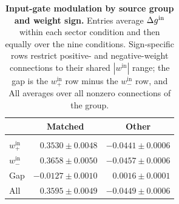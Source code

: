 \begin{table}[t]
\caption{\textbf{Input-gate modulation by source group and weight sign.} Entries average \(\Delta g^{\mathrm{in}}\) within each sector condition and then equally over the nine conditions. Sign-specific rows restrict positive- and negative-weight connections to their shared \(|w^{\mathrm{in}}|\) range; the gap is the \(w^{\mathrm{in}}_{+}\) row minus the \(w^{\mathrm{in}}_{-}\) row, and All averages over all nonzero connections of the group.}
\label{tab:input-gate-sign}
\begin{center}
\small
\setlength{\tabcolsep}{8pt}
\begin{tabular}{lrr}
\multicolumn{1}{c}{} &
\multicolumn{1}{c}{\bf Matched} &
\multicolumn{1}{c}{\bf Other}
\\ \hline \\
\(w^{\mathrm{in}}_{+}\) & \(0.3530 \pm 0.0048\) & \(-0.0441 \pm 0.0006\) \\
\(w^{\mathrm{in}}_{-}\) & \(0.3658 \pm 0.0050\) & \(-0.0457 \pm 0.0006\) \\
Gap & \(-0.0127 \pm 0.0010\) & \(0.0016 \pm 0.0001\) \\
All & \(0.3595 \pm 0.0049\) & \(-0.0449 \pm 0.0006\) \\
\end{tabular}
\end{center}
\end{table}

